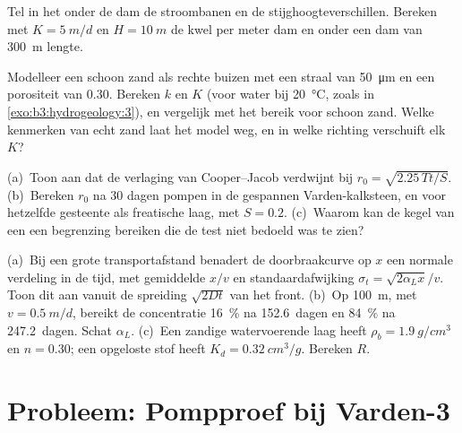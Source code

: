 \begin{exercise}[$\star\star$]\label{exo:b3:hydrogeology:9}
Tel in het  onder de dam de stroombanen en de stijghoogteverschillen.
Bereken met $K = \qty{5}{m/d}$ en $H = \qty{10}{m}$ de kwel per
meter dam en onder een dam van \qty{300}{m} lengte.
\end{exercise}

\begin{exercise}[$\star\star\star$]\label{exo:b3:hydrogeology:10}
Modelleer een schoon zand als rechte buizen met een straal van \qty{50}{\micro\metre} en een
porositeit van 0.30. Bereken $k$ en $K$ (voor water bij \qty{20}{\celsius}, zoals in
\cref{exo:b3:hydrogeology:3}),
en vergelijk met het bereik voor schoon zand. Welke kenmerken van echt zand
laat het model weg, en in welke richting verschuift elk $K$?
\end{exercise}

\begin{exercise}[$\star\star\star$]\label{exo:b3:hydrogeology:11}
(a)~Toon aan dat de verlaging van Cooper--Jacob verdwijnt bij $r_0 =
\sqrt{2.25\,Tt/S}$. (b)~Bereken $r_0$ na 30 dagen pompen in de
gespannen Varden-kalksteen, en voor hetzelfde gesteente als freatische laag, met $S =
0.2$. (c)~Waarom kan de kegel van een  een begrenzing bereiken
die de test niet bedoeld was te zien?
\end{exercise}

\begin{exercise}[$\star\star\star$]\label{exo:b3:hydrogeology:12}
(a)~Bij een grote transportafstand benadert de doorbraakcurve op $x$ een
normale verdeling in de tijd, met gemiddelde $x/v$ en standaardafwijking $\sigma_t
= \sqrt{2\alpha_Lx}/v$. Toon dit aan vanuit de spreiding $\sqrt{2Dt}$ van het front.
(b)~Op \qty{100}{m}, met $v = \qty{0.5}{m/d}$, bereikt de concentratie
\qty{16}{\percent} na \num{152.6}~dagen en \qty{84}{\percent} na
\num{247.2}~dagen. Schat $\alpha_L$. (c)~Een zandige watervoerende laag heeft $\rho_b =
\qty{1.9}{g/cm^3}$ en $n = 0.30$; een opgeloste stof heeft $K_d =
\qty{0.32}{cm^3/g}$. Bereken $R$.
\end{exercise}

\section{Probleem: Pompproef bij Varden-3}

